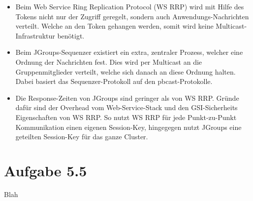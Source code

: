 \documentclass[german,12pt,a4paper]{article}
\begin{document}
\begin{itemize}

	\item Beim Web Service Ring Replication Protocol (WS RRP) wird mit Hilfe des Tokens nicht nur
		der Zugriff geregelt, sondern auch Anwendungs-Nachrichten verteilt. Welche an den Token gehangen
		werden, somit wird keine Multicast-Infrastruktur benötigt.

	\item Beim JGroups-Sequenzer existiert ein extra, zentraler Prozess, welcher eine Ordnung der
		Nachrichten fest. Dies wird per Multicast an die Gruppenmitglieder verteilt, welche sich
		danach an diese Ordnung halten. Dabei basiert das Sequenzer-Protokoll auf den
		pbcast-Protokolle.
	
	\item Die Response-Zeiten von JGroups sind geringer als von WS RRP. Gründe dafür sind der
		Overhead vom Web-Service-Stack und den GSI-Sicherheits Eigenschaften von WS RRP. So nutzt WS
		RRP für jede Punkt-zu-Punkt Kommunikation einen eigenen Session-Key, hingegegen nutzt
		JGroups eine geteilten Session-Key für das ganze Cluster.

\end{itemize}

\section*{Aufgabe 5.5}

Blah
\end{document}
